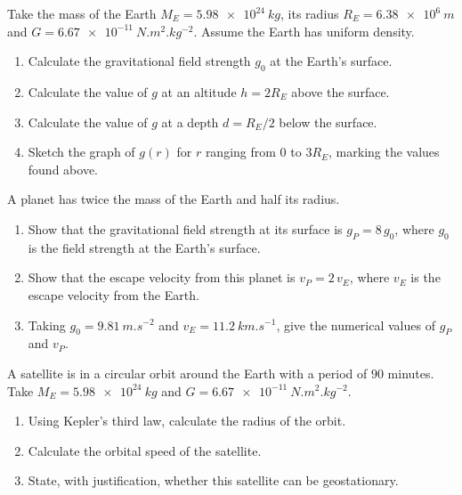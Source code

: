\documentclass[11pt]{article}
\newcounter{popsec}
\newcounter{popsub}
\newcommand{\courssub}[1]{%
  \stepcounter{popsub}%
  \par\vspace{9pt}\noindent{\popxbold\fontsize{11.5}{13}\selectfont\color{popink}{\color{poporange}\thepopsec.\thepopsub}\hspace{6pt}#1}\par\nopagebreak\vspace{4pt}
}
\begin{document}
\courssub{I practise}

\begin{exercice}
Take the mass of the Earth $M_E = \SI{5.98e24}{kg}$, its radius $R_E = \SI{6.38e6}{m}$ and $G = \SI{6.67e-11}{N.m^2.kg^{-2}}$. Assume the Earth has uniform density.
\begin{enumerate}
\item Calculate the gravitational field strength $g_0$ at the Earth's surface.
\item Calculate the value of $g$ at an altitude $h = 2R_E$ above the surface.
\item Calculate the value of $g$ at a depth $d = R_E/2$ below the surface.
\item Sketch the graph of $g(r)$ for $r$ ranging from $0$ to $3R_E$, marking the values found above.
\end{enumerate}
\end{exercice}

\begin{exercice}
A planet has twice the mass of the Earth and half its radius.
\begin{enumerate}
\item Show that the gravitational field strength at its surface is $g_P = 8\,g_0$, where $g_0$ is the field strength at the Earth's surface.
\item Show that the escape velocity from this planet is $v_P = 2\,v_E$, where $v_E$ is the escape velocity from the Earth.
\item Taking $g_0 = \SI{9.81}{m.s^{-2}}$ and $v_E = \SI{11.2}{km.s^{-1}}$, give the numerical values of $g_P$ and $v_P$.
\end{enumerate}
\end{exercice}

\begin{exercice}
A satellite is in a circular orbit around the Earth with a period of $90$ minutes. Take $M_E = \SI{5.98e24}{kg}$ and $G = \SI{6.67e-11}{N.m^2.kg^{-2}}$.
\begin{enumerate}
\item Using Kepler's third law, calculate the radius of the orbit.
\item Calculate the orbital speed of the satellite.
\item State, with justification, whether this satellite can be geostationary.
\end{enumerate}
\end{exercice}
\end{document}
